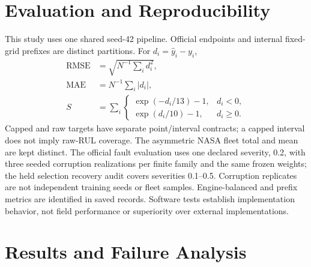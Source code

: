 \documentclass[conference]{IEEEtran}
\begin{document}
\section{\textbf{Evaluation and Reproducibility}}
\label{sec:evaluation}
This study uses one shared seed-42 pipeline. Official endpoints and
internal fixed-grid prefixes are distinct partitions. For $d_i=\widehat y_i-y_i$,
\begin{align}
\operatorname{RMSE}&=\sqrt{N^{-1}\textstyle\sum_i d_i^2},\\
\operatorname{MAE}&=N^{-1}\textstyle\sum_i|d_i|,\\
S&=\textstyle\sum_i\begin{cases}\exp(-d_i/13)-1,&d_i<0,\\
\exp(d_i/10)-1,&d_i\geq0.\end{cases}
\end{align}
Capped and raw targets have separate point/interval contracts; a capped interval
does not imply raw-RUL coverage. The asymmetric NASA fleet total and mean are
kept distinct. The official fault evaluation uses one declared severity, 0.2, with
three seeded corruption realizations per finite family and the same frozen
weights; the held selection recovery audit covers severities 0.1--0.5.
Corruption replicates are not independent training seeds or fleet samples.
Engine-balanced and prefix metrics are identified in saved records. Software
tests establish implementation behavior, not field performance or superiority
over external implementations.

\section{\textbf{Results and Failure Analysis}}
\label{sec:results}

\end{document}

